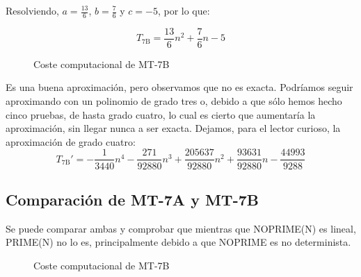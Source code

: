 Resolviendo, $a=\frac{13}{6}$, $b=\frac{7}{6}$ y $c=-5$, por lo que:

\begin{equation}
    T_{\mathrm{7B}} = \frac{13}{6}n^2 + \frac{7}{6}n - 5
\end{equation}

\begin{figure}[H]
    \centering
    
    \caption{Coste computacional de MT-7B}
\end{figure}

Es una buena aproximación, pero observamos que no es exacta. Podríamos seguir aproximando con un polinomio de grado tres o, debido a que sólo hemos hecho cinco pruebas, de hasta grado cuatro, lo cual es cierto que aumentaría la aproximación, sin llegar nunca a ser exacta. Dejamos, para el lector curioso, la aproximación de grado cuatro:
\begin{equation}
    T_{\mathrm{7B}}' = - \frac{1}{3440}n^4 - \frac{271}{92880}n^3 + \frac{205637}{92880}n^2 + \frac{93631}{92880}n - \frac{44993}{9288}
\end{equation}



\subsection{Comparación de MT-7A y MT-7B}

Se puede comparar ambas y comprobar que mientras que NOPRIME(N) es lineal, PRIME(N) no lo es, principalmente debido a que NOPRIME es no determinista.

\begin{figure}[H]
    \centering
    
    \caption{ Coste computacional de MT-7B}
\end{figure}